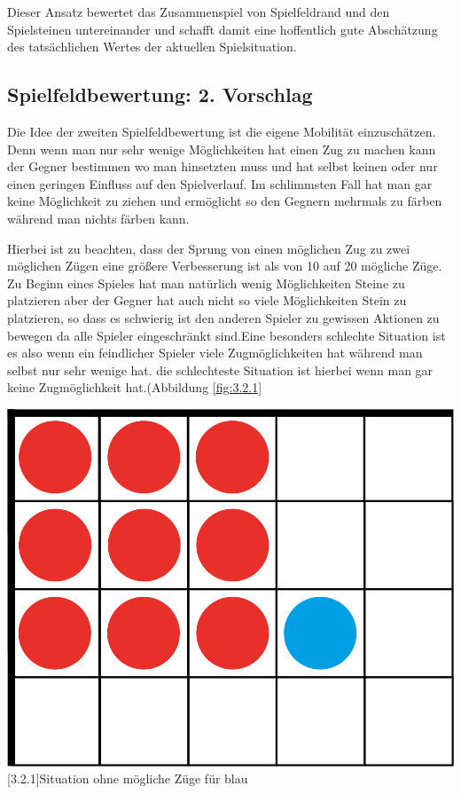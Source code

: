 \documentclass[12pt,a4paper,bibliography=totocnumbered,listof=totocnumbered]{scrartcl}
\begin{document}
	Dieser Ansatz bewertet das Zusammenspiel von Spielfeldrand und den Spielsteinen untereinander und schafft damit eine hoffentlich gute Abschätzung des tatsächlichen Wertes der aktuellen Spielsituation.

    \subsection{Spielfeldbewertung: 2. Vorschlag}

    Die Idee der zweiten Spielfeldbewertung ist die eigene Mobilität einzuschätzen. Denn wenn man nur sehr wenige Möglichkeiten hat einen Zug zu machen kann der Gegner bestimmen wo man hinsetzten muss und hat selbst keinen oder nur einen geringen Einfluss auf den Spielverlauf. Im schlimmsten Fall hat man gar keine Möglichkeit zu ziehen und ermöglicht so den Gegnern mehrmals zu färben während man nichts färben kann.

    \vspace{1em}


    Hierbei ist zu beachten, dass der Sprung von einen möglichen Zug zu zwei möglichen Zügen eine größere Verbesserung ist als von 10 auf 20 mögliche Züge.
    Zu Beginn eines Spieles hat man natürlich wenig Möglichkeiten Steine zu platzieren aber der Gegner hat auch nicht so viele Möglichkeiten Stein zu platzieren, so dass es schwierig ist den anderen Spieler zu gewissen Aktionen zu bewegen da alle Spieler eingeschränkt sind.Eine besonders schlechte Situation ist es also wenn ein feindlicher Spieler viele Zugmöglichkeiten hat während man selbst nur sehr wenige hat.
    die schlechteste Situation ist hierbei wenn man gar keine Zugmöglichkeit hat.(Abbildung \ref{fig:3.2.1} 


   	\vspace{1em}
	\begin{minipage}{\linewidth}
		\centering
		\includegraphics[width=0.33\linewidth]{pics/Kapitel_3/Kapitel_3_pic5.png}
		[3.2.1]{Situation ohne mögliche Züge für blau}
		\label{fig:3.2.1}
	\end{minipage}
	\vspace{1em}
	
\end{document}
